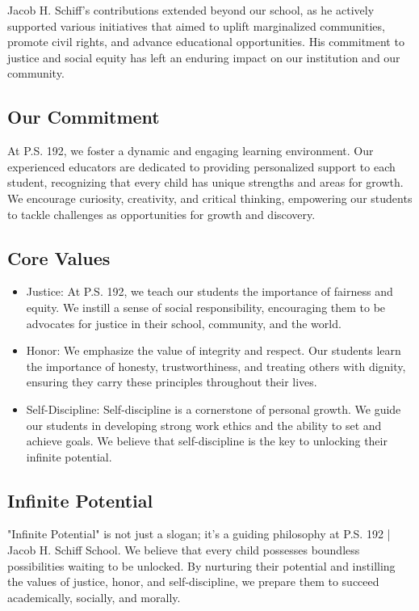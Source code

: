 \documentclass[11pt, letterpaper]{article}
\begin{document}
Jacob H. Schiff's contributions extended beyond our school, as he actively supported various initiatives that aimed to uplift marginalized communities, promote civil rights, and advance educational opportunities. His commitment to justice and social equity has left an enduring impact on our institution and our community.

\subsection{Our Commitment}
At P.S. 192, we foster a dynamic and engaging learning environment. Our experienced educators are dedicated to providing personalized support to each student, recognizing that every child has unique strengths and areas for growth. We encourage curiosity, creativity, and critical thinking, empowering our students to tackle challenges as opportunities for growth and discovery.

\subsection{Core Values}
\begin{itemize}
\item Justice: At P.S. 192, we teach our students the importance of fairness and equity. We instill a sense of social responsibility, encouraging them to be advocates for justice in their school, community, and the world.
\item Honor: We emphasize the value of integrity and respect. Our students learn the importance of honesty, trustworthiness, and treating others with dignity, ensuring they carry these principles throughout their lives.
\item Self-Discipline: Self-discipline is a cornerstone of personal growth. We guide our students in developing strong work ethics and the ability to set and achieve goals. We believe that self-discipline is the key to unlocking their infinite potential.
\end{itemize}

\subsection{Infinite Potential}
"Infinite Potential" is not just a slogan; it's a guiding philosophy at P.S. 192 | Jacob H. Schiff School. We believe that every child possesses boundless possibilities waiting to be unlocked. By nurturing their potential and instilling the values of justice, honor, and self-discipline, we prepare them to succeed academically, socially, and morally.
\end{document}
